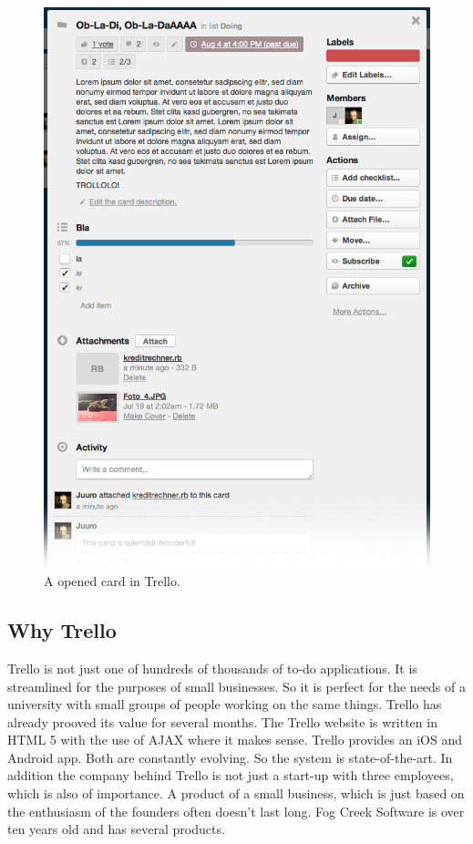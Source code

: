 \begin{figure}[htb]
\centering
\includegraphics[width=\textwidth]{figures/trello-card}
\caption{A opened card in Trello.}
\label{fig:trello-card}
\end{figure}

\subsection{Why Trello}
Trello is not just one of hundreds of thousands of to-do applications. It is streamlined for the purposes of small businesses. So it is perfect for the needs of a university with small groups of people working on the same things. Trello has already prooved its value for several months. The Trello website is written in HTML 5 with the use of AJAX where it makes sense. Trello provides an iOS \cite{trello:ios} and Android \cite{trello:android} app. Both are constantly evolving. So the system is state-of-the-art. In addition the company behind Trello is not just a start-up with three employees, which is also of importance. A product of a small business, which is just based on the enthusiasm of the founders often doesn't last long. Fog Creek Software is over ten years old and has several products.

